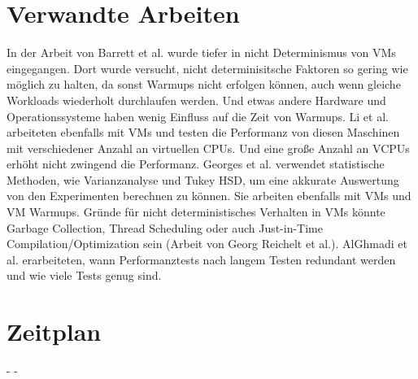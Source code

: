 \documentclass{article}
\begin{document}
\section{Verwandte Arbeiten}
In der Arbeit von Barrett et al. wurde tiefer in nicht Determinismus von VMs eingegangen.
Dort wurde versucht, nicht determinisitsche Faktoren so gering wie möglich zu halten, da sonst Warmups nicht erfolgen können, auch wenn gleiche Workloads wiederholt durchlaufen werden. Und etwas andere Hardware und Operationssysteme haben wenig Einfluss auf die Zeit von Warmups. Li et al. arbeiteten ebenfalls mit VMs und testen die Performanz von diesen Maschinen mit verschiedener Anzahl an virtuellen CPUs. Und eine große Anzahl an VCPUs erhöht nicht zwingend die Performanz.
Georges et al. verwendet statistische Methoden, wie Varianzanalyse und Tukey HSD, um eine akkurate Auswertung von den Experimenten berechnen zu können. Sie arbeiten ebenfalls mit VMs und VM Warmups.
Gründe für nicht deterministisches Verhalten in VMs könnte Garbage Collection, Thread Scheduling oder auch Just-in-Time Compilation/Optimization sein (Arbeit von Georg Reichelt et al.).
AlGhmadi et al. erarbeiteten, wann Performanztests nach langem Testen redundant werden und wie viele Tests genug sind.
 
\newpage
\section{Zeitplan}
- - 
{}

\end{document}
